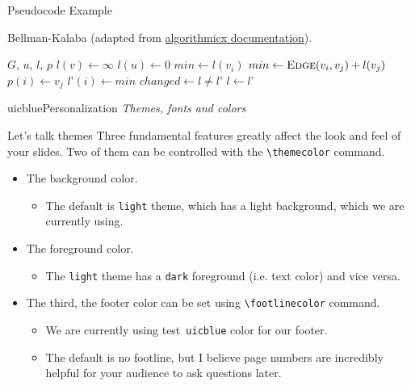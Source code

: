 \documentclass{beamer}
\newcommand{\hrefcol}[2]{\textcolor{uihteal}{\href{#1}{#2}}}
\newcommand{\testcolor}[1]{\colorbox{#1}{\textcolor{#1}{test}}~\texttt{#1}}
\begin{document}
\footlinecolor{}

\begin{frame}[fragile]{Pseudocode Example}
\begin{algorithm}[H]
\fontsize{8}{1}\selectfont
\caption{Bellman-Kalaba (adapted from \hrefcol{https://www.ctan.org/tex-archive/macros/latex/contrib/algorithmicx/algorithmicx.pdf}{algorithmicx documentation}).}
\begin{algorithmic}
\REQUIRE $G$, $u$, $l$, $p$
    \STATE $l(v) \leftarrow \infty$
\ENDFOR
\STATE $l(u) \leftarrow 0$
\REPEAT
        \STATE $min \leftarrow l(v_i)$
                \STATE $min \leftarrow \textsc{Edge}(v_i, v_j) + l(v_j)$ 
                \STATE $p(i) \leftarrow v_j$
            \ENDIF
        \ENDFOR
        \STATE $l’(i) \leftarrow min$
    \ENDFOR
    \STATE $changed \leftarrow l \not= l’$
    \STATE $l \leftarrow l’$
\end{algorithmic}
\end{algorithm}
\end{frame}



\begin{chapter}{uicblue}{Personalization}
\textit{Themes, fonts and colors}
\end{chapter}


\begin{frame}[fragile]{Let's talk themes}
Three fundamental features greatly affect the look and feel of your slides. Two of them can be controlled with the \verb|\themecolor| command.
\begin{itemize}
\item The background color.
\begin{itemize}
    \item The default is \verb|light| theme, which has a light background, which we are currently using.
\end{itemize}
\item The foreground color.
\begin{itemize}
    \item The \verb|light| theme has a \verb|dark| foreground (i.e. text color) and vice versa.
\end{itemize}
\item The third, the footer color can be set using \verb|\footlinecolor| command.
\begin{itemize}
    \item We are currently using \testcolor{uicblue} color for our footer.
    \item The default is no footline, but I believe page numbers are incredibly helpful for your audience to ask questions later.
\end{itemize}
\end{itemize}
\end{frame}
\end{document}
